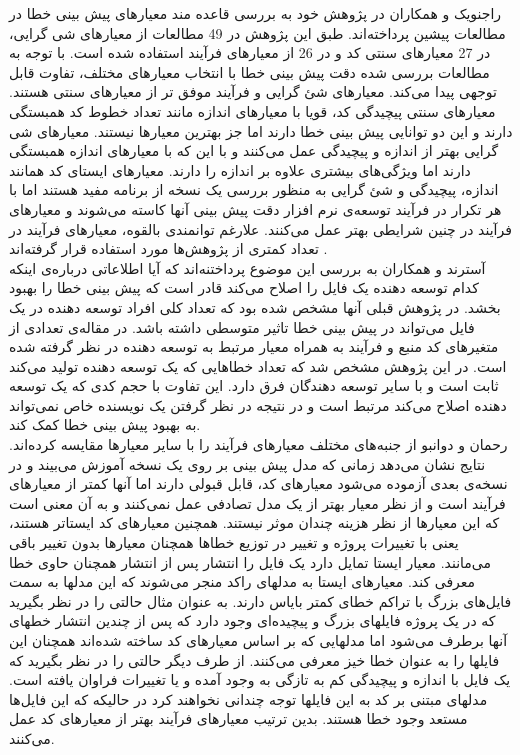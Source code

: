 راجنویک و همکاران در پژوهش خود به بررسی قاعده مند  معیارهای پیش بینی خطا در مطالعات پیشین پرداخته‌اند.  طبق این پژوهش در 49\lr{\%} مطالعات از معیارهای شی گرایی، در 27 \lr{\%} معیارهای سنتی کد و در 26 \lr{\%} از معیارهای فرآیند استفاده شده است. با توجه به مطالعات بررسی شده دقت پیش بینی خطا  با انتخاب معیارهای مختلف، تفاوت قابل توجهی  پیدا می‌کند. معیارهای شئ گرایی و فرآیند موفق تر از معیارهای سنتی هستند. معیارهای سنتی  پیچیدگی کد، قویا با معیارهای اندازه مانند تعداد خطوط کد همبستگی دارند و این دو توانایی پیش بینی خطا دارند اما جز بهترین معیارها نیستند. معیارهای شی گرایی بهتر از اندازه و پیچیدگی عمل می‌کنند و با این که با معیارهای اندازه همبستگی دارند اما ویژگی‌های بیشتری علاوه بر اندازه را دارند. معیارهای ایستای کد همانند اندازه، پیچیدگی و شئ گرایی به منظور بررسی یک نسخه از برنامه مفید هستند اما با هر تکرار در فرآیند توسعه‌ی نرم افزار دقت پیش بینی آنها کاسته می‌شوند و معیارهای فرآیند در چنین شرایطی بهتر عمل می‌کنند. علارغم توانمندی بالقوه، معیارهای فرآیند در تعداد کمتری از پژوهش‌ها مورد استفاده قرار گرفته‌اند \cite{radjenovic2013software}. \\
 
آسترند و همکاران به بررسی این موضوع پرداختنه‌اند که آیا اطلاعاتی درباره‌ی اینکه کدام توسعه دهنده یک فایل را اصلاح می‌کند قادر است که پیش بینی خطا را بهبود بخشد. در پژوهش قبلی آنها\cite{weyuker2008too} مشخص شده بود که تعداد کلی   افراد توسعه دهنده در یک فایل می‌تواند در پیش بینی خطا تاثیر متوسطی داشته باشد. در  مقاله‌ی \cite{ostrand2010programmer}  تعدادی از متغیرهای کد منبع و فرآیند به همراه معیار مرتبط به توسعه دهنده در نظر گرفته شده است.  در این پژوهش مشخص شد  که تعداد خطاهایی که یک توسعه دهنده تولید می‌کند ثابت است و با سایر توسعه دهندگان فرق دارد. این تفاوت با  حجم کدی که یک توسعه دهنده اصلاح می‌کند مرتبط است و در نتیجه در نظر گرفتن یک نویسنده خاص نمی‌تواند به بهبود پیش بینی خطا کمک کند\cite{ostrand2010programmer}. \\

رحمان و دوانبو از جنبه‌های مختلف معیارهای فرآیند  را با سایر معیارها مقایسه کرده‌اند\cite{rahman2013and}. نتایج نشان می‌دهد  زمانی که مدل پیش بینی بر روی یک نسخه آموزش می‌بیند و در نسخه‌ی بعدی آزموده می‌شود معیارهای کد،  قابل قبولی دارند اما    آنها کمتر از معیارهای فرآیند است  و از نظر معیار 
بهتر از یک مدل تصادفی عمل نمی‌کنند و  به آن معنی است که این معیارها از نظر هزینه چندان  موثر نیستند. همچنین معیارهای کد ایستاتر هستند، ‌یعنی با تغییرات پروژه و تغییر در توزیع خطاها همچنان معیارها بدون تغییر باقی می‌مانند. معیار ایستا تمایل دارد یک فایل را انتشار پس از انتشار همچنان حاوی خطا معرفی کند. معیارهای ایستا به مدلهای راکد منجر می‌شوند که این مدلها به سمت فایل‌های بزرگ با تراکم خطای کمتر بایاس دارند. به عنوان مثال حالتی را در نظر بگیرید که در یک پروژه فایلهای بزرگ و پیچیده‌ای وجود دارد که پس از چندین انتشار خطهای آنها برطرف می‌شود اما مدلهایی که بر اساس معیارهای کد ساخته شده‌اند همچنان این فایلها را به عنوان خطا خیز معرفی می‌کنند. از طرف دیگر حالتی را در نظر بگیرید که یک فایل با اندازه و پیچیدگی کم به تازگی به وجود آمده و یا تغییرات فراوان یافته است. مدلهای مبتنی بر کد به این فایلها توجه چندانی نخواهند کرد در حالیکه که این فایل‌ها مستعد وجود خطا هستند. بدین ترتیب معیارهای فرآیند بهتر از معیارهای کد عمل می‌کنند. 
 
 
